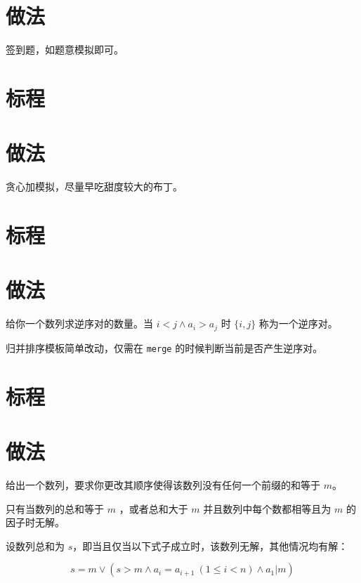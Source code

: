 \documentclass{../cpct/ctsol}
\begin{document}

\makesolution
\section*{做法}

签到题，如题意模拟即可。

\section*{标程}


\makesolution
\section*{做法}

贪心加模拟，尽量早吃甜度较大的布丁。

\section*{标程}


\makesolution
\section*{做法}

给你一个数列求逆序对的数量。当 $i < j \land a_i > a_j$ 时 $\{i,j\}$ 称为一个逆序对。

归并排序模板简单改动，仅需在 \lstinline{merge} 的时候判断当前是否产生逆序对。

\section*{标程}


\makesolution
\section*{做法}

给出一个数列，要求你更改其顺序使得该数列没有任何一个前缀的和等于 $m$。

只有当数列的总和等于 $m$ ，或者总和大于 $m$ 并且数列中每个数都相等且为 $m$ 的因子时无解。

设数列总和为 $s$，即当且仅当以下式子成立时，该数列无解，其他情况均有解：

$$
s=m \lor \left(s>m \land a_i=a_{i+1}~(1 \leq i < n) \land a_1 | m \right)
$$
\end{document}
